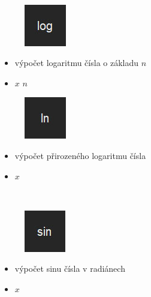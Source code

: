 \documentclass[a4paper, 12pt]{article}
\begin{document}
\\%
\begin{minipage}{0.07\textwidth}
\begin{figure}[H]
\includegraphics[scale=0.7]{ilog.jpg}
\end{figure}
\end{minipage}
\begin{minipage}{0.45\textwidth}
\begin{itemize}
\item výpočet logaritmu čísla o základu $n$
\item $x$  $n$ \keys{=}
\end{itemize}
\end{minipage}
\begin{minipage}{0.07\textwidth}
\begin{figure}[H]
\includegraphics[scale=0.7]{iln.jpg}
\end{figure}
\end{minipage}
\begin{minipage}{0.45\textwidth}
\begin{itemize}
\item výpočet přirozeného logaritmu čísla
\item {} $x$ \keys{=}
\end{itemize}
\end{minipage}
\\%
\begin{minipage}{0.07\textwidth}
\begin{figure}[H]
\includegraphics[scale=0.7]{isin.jpg}
\end{figure}
\end{minipage}
\begin{minipage}{0.45\textwidth}
\begin{itemize}
\item výpočet sinu čísla v radiánech
\item {} $x$ \keys{=}
\end{itemize}
\end{minipage}
\end{document}
